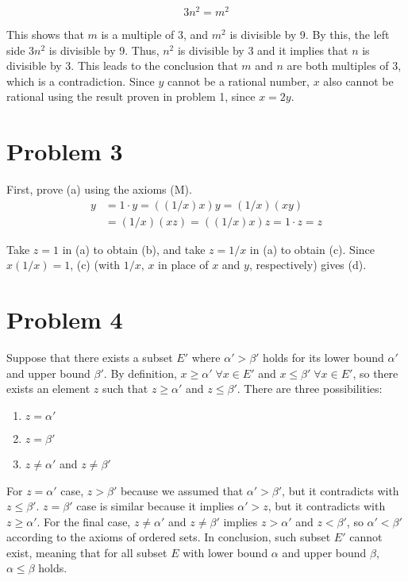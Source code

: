 \documentclass{scrartcl}
\begin{document}
\[
  3n^2 = m^2
\]

This shows that \(m\) is a multiple of 3, and \(m^2\) is divisible by 9. By this, the left side \(3n^2\) is divisible by 9. Thus, \(n^2\) is divisible by 3 and it implies that \(n\) is divisible by 3. This leads to the conclusion that \(m\) and \(n\) are both multiples of 3, which is a contradiction. Since \(y\) cannot be a rational number, \(x\) also cannot be rational using the result proven in problem 1, since \(x = 2y\).

\section{Problem 3}
First, prove (a) using the axioms (M).
\begin{align*}
  y &= 1 \cdot y = ((1 / x) x) y = (1 / x) (xy) \\
    &= (1 / x) (xz) = ((1 / x) x) z = 1 \cdot z = z
\end{align*}

Take \(z = 1\) in (a) to obtain (b), and take \(z = 1 / x\) in (a) to obtain (c). Since \(x (1 / x) = 1\), (c) (with \(1 / x\), \(x\) in place of \(x\) and \(y\), respectively) gives (d).

\section{Problem 4}
Suppose that there exists a subset \(E'\) where \(\alpha' > \beta'\) holds for its lower bound \(\alpha'\) and upper bound \(\beta'\). By definition, \(x \geq \alpha' \; \forall x \in E'\) and \(x \leq \beta' \; \forall x \in E'\), so there exists an element \(z\) such that \(z \geq \alpha'\) and \(z \leq \beta'\). There are three possibilities:

\begin{enumerate}
  \item \(z = \alpha'\)
  \item \(z = \beta'\)
  \item \(z \not = \alpha'\) and \(z \not = \beta'\)
\end{enumerate}

For \(z = \alpha'\) case, \(z > \beta'\) because we assumed that \(\alpha' > \beta'\), but it contradicts with \(z \leq \beta'\). \(z = \beta'\) case is similar because it implies \(\alpha' > z\), but it contradicts with \(z \geq \alpha'\). For the final case, \(z \not = \alpha'\) and \(z \not = \beta'\) implies \(z > \alpha'\) and \(z < \beta'\), so \(\alpha' < \beta'\) according to the axioms of ordered sets. In conclusion, such subset \(E'\) cannot exist, meaning that for all subset \(E\) with lower bound \(\alpha\) and upper bound \(\beta\), \(\alpha \leq \beta\) holds.
\end{document}
